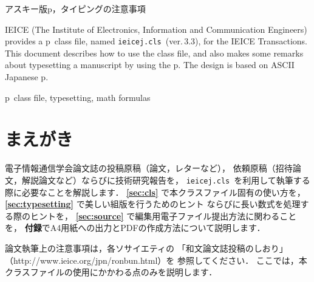 \documentclass[paper]{ieicej}%
\def\IEICEJcls{\texttt{ieicej.cls}}
\def\IEICEJver{3.3}
\begin{document}
\makeatletter
\if@letter
\makeatother
\maketitle
\fi
\begin{abstract}
電子情報通信学会論文誌の p\LaTeXe\ クラスファイル，
\IEICEJcls{}（\texttt{version \IEICEJver}）の使い方を説明します．
本クラスファイルに基づく記述の仕方，クラスファイル使用上の注意点，
ならびにタイピングの際の注意事項です．
本クラスファイルは，アスキー版 p\LaTeXe\ に基づいて作成しています．
\end{abstract}
\begin{keyword}
アスキー版p\LaTeXe{}，タイピングの注意事項
\end{keyword}
\begin{eabstract}
IEICE (The Institute of Electronics, Information and Communication Engineers) 
provides a p\LaTeXe\ class file, named \IEICEJcls\ (ver.\,\IEICEJver), 
for the IEICE Transactions. This document describes how to use 
the class file, and also makes some remarks about typesetting 
a manuscript by using the p\LaTeXe. 
The design is based on ASCII Japanese p\LaTeXe. 
\end{eabstract}
\begin{ekeyword}
p\LaTeXe\ class file, typesetting, math formulas
\end{ekeyword}
\makeatletter
\if@letter
\makeatother
\else
 \maketitle
\fi

\section{まえがき}

電子情報通信学会論文誌の投稿原稿（論文，レターなど），
依頼原稿（招待論文，解説論文など）ならびに技術研究報告を，
\IEICEJcls\ を利用して執筆する際に必要なことを解説します．
{\bfseries \ref{sec:cls}} で本クラスファイル固有の使い方を，
{\bfseries \ref{sec:typesetting}} で美しい組版を行うためのヒント
ならびに長い数式を処理する際のヒントを，
{\bfseries \ref{sec:source}} で編集用電子ファイル提出方法に関わることを，
{\bfseries 付録}でA4用紙への出力とPDFの作成方法について説明します．

論文執筆上の注意事項は，各ソサイエティの
「和文論文誌投稿のしおり」
（http://www.ieice.org\slash{}jpn\slash{}ronbun.html）を
参照してください．
ここでは，本クラスファイルの使用にかかわる点のみを説明します．
\end{document}
